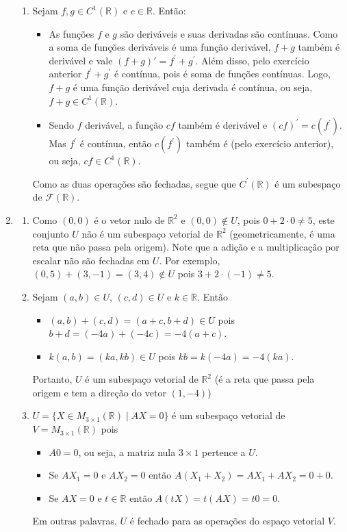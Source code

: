 \documentclass[12pt,a4paper]{article}
\newcommand*\R{\mathbb{R}}
\begin{document}
\begin{enumerate}
\begin{enumerate}
\item Sejam $f,g \in C^1(\R)$ e $c \in \R$. Então:
\begin{itemize}
\item As funções $f$ e $g$ são deriváveis e suas derivadas são contínuas. Como a soma de funções deriváveis é uma função derivável, $f+g$ também é derivável e vale $(f+g)' = f^\prime + g^\prime$. Além disso, pelo exercício anterior $f^\prime+g^\prime$ é contínua, pois é soma de funções contínuas. Logo, $f+g$ é uma função derivável cuja derivada é contínua, ou seja, $f+g \in C^1(\R)$.
\item Sendo $f$ derivável, a função $cf$ também é derivável e $(cf)^\prime = c (f^\prime)$. Mas $f^\prime$ é contínua, então $c (f^\prime)$ também é (pelo exercício anterior), ou seja, $cf \in C^1(\R)$.
\end{itemize}
Como as duas operações são fechadas, segue que $C^\prime(\R)$ é um subespaço de $\mathcal{F}(\R)$.
\end{enumerate}

\item
\begin{enumerate}
\item Como $(0,0)$ é o vetor nulo de $\R^2$ e $(0,0) \not\in U$, pois $0+2\cdot 0 \neq 5$, este conjunto $U$ não é um subespaço vetorial de $\R^2$ (geometricamente, é uma reta que não passa pela origem). Note que a adição e a multiplicação por escalar não são fechadas em $U$. Por exemplo, $(0,5)+(3,-1)=(3,4) \not\in U$ pois $3+2\cdot (-1) \neq 5$.

\item Sejam $(a,b) \in U$, $(c,d) \in U$ e $k \in \R$. Então
\begin{itemize}
\item $(a,b)+(c,d) = (a+c,b+d) \in U$ pois $b+d=(-4a)+(-4c)=-4(a+c)$.
\item $k(a,b) = (ka,kb) \in U$ pois $kb=k(-4a)=-4(ka)$.
\end{itemize}
Portanto, $U$ é um subespaço vetorial de $\R^2$ (é a reta que passa pela origem e tem a direção do vetor $(1,-4)$)

\item $U = \{ X \in M_{3 \times 1}(\R) \mid AX = 0 \}$ é um subespaço vetorial de $V = M_{3 \times 1}(\R)$ pois
\begin{itemize}
\item $A0 = 0$, ou seja, a matriz nula $3 \times 1$ pertence a $U$.
\item Se $AX_1=0$ e $AX_2=0$ então $A(X_1+X_2)=AX_1 + AX_2 = 0 + 0$.
\item Se $AX=0$ e $t \in \R$ então $A(tX)=t(AX) = t0 = 0$.
\end{itemize}
Em outras palavras, $U$ é fechado para as operações do espaço vetorial $V$. 


\end{enumerate}
\end{enumerate}
\end{document}
